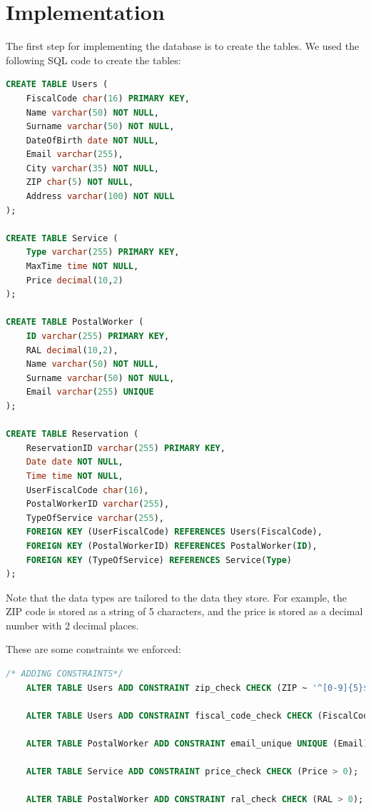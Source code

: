 \documentclass{article}
\begin{document}
\section{Implementation}
The first step for implementing the database is to create the tables. We used the following SQL code to create the tables:

\begin{lstlisting}[language=SQL]
CREATE TABLE Users (
    FiscalCode char(16) PRIMARY KEY,
    Name varchar(50) NOT NULL,
    Surname varchar(50) NOT NULL,
    DateOfBirth date NOT NULL,
    Email varchar(255),
    City varchar(35) NOT NULL,
    ZIP char(5) NOT NULL,
    Address varchar(100) NOT NULL
);

CREATE TABLE Service (
    Type varchar(255) PRIMARY KEY,
    MaxTime time NOT NULL,
    Price decimal(10,2)
);

CREATE TABLE PostalWorker (
    ID varchar(255) PRIMARY KEY,
    RAL decimal(10,2),
    Name varchar(50) NOT NULL,
    Surname varchar(50) NOT NULL,
    Email varchar(255) UNIQUE
);

CREATE TABLE Reservation (
    ReservationID varchar(255) PRIMARY KEY,
    Date date NOT NULL,
    Time time NOT NULL,
    UserFiscalCode char(16),
    PostalWorkerID varchar(255),
    TypeOfService varchar(255),
    FOREIGN KEY (UserFiscalCode) REFERENCES Users(FiscalCode),
    FOREIGN KEY (PostalWorkerID) REFERENCES PostalWorker(ID),
    FOREIGN KEY (TypeOfService) REFERENCES Service(Type)
);
\end{lstlisting}

Note that the data types are tailored to the data they store. For example, the ZIP code is stored as a string of 5 characters, and the price is stored as a decimal number with 2 decimal places.

These are some constraints we enforced:
\begin{lstlisting}[language=SQL]
    /* ADDING CONSTRAINTS*/
    ALTER TABLE Users ADD CONSTRAINT zip_check CHECK (ZIP ~ '^[0-9]{5}$');
    
    ALTER TABLE Users ADD CONSTRAINT fiscal_code_check CHECK (FiscalCode ~ '^[A-Z]{6}[0-9]{2}[A-Z][0-9]{2}[A-Z][0-9]{3}[A-Z]$');
    
    ALTER TABLE PostalWorker ADD CONSTRAINT email_unique UNIQUE (Email);
    
    ALTER TABLE Service ADD CONSTRAINT price_check CHECK (Price > 0);
    
    ALTER TABLE PostalWorker ADD CONSTRAINT ral_check CHECK (RAL > 0);
\end{lstlisting}
\end{document}
